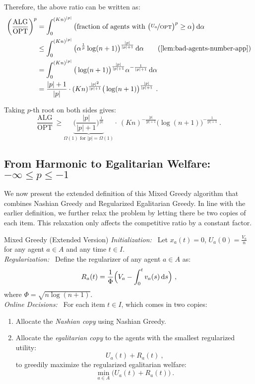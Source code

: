 \documentclass[11pt,letterpaper]{article}
\newcommand{\OPT}{\mathrm{OPT}}
\newcommand{\ALG}{\mathrm{ALG}}
\newcommand{\dif}[1]{\,\text{\rm d} #1}
\newcommand{\utility}{U}
\newcommand{\regularizer}{R}
\begin{document}
Therefore, the above ratio can be written as:
\begin{align*}
	\bigg( \frac{\ALG}{\OPT} \bigg)^p
	& = \int_0^{(Kn)^{|p|}} \big(\text{fraction of agents with $\big( \nicefrac{\utility_a}{\OPT} \big)^p \ge \alpha$}\big) \dif{\alpha} \\
	&
	\le \int_0^{(Kn)^{|p|}} \big( \alpha^{\frac{1}{p}} \log(n+1) \big)^{\frac{|p|}{|p|+1}} \dif{\alpha} 
	\tag{\Cref{lem:bad-agents-number-app}} \\
	&
	= \int_0^{(Kn)^{|p|}} \big( \log(n+1) \big)^{\frac{|p|}{|p|+1}} \alpha^{-\frac{1}{|p|+1}} \dif{\alpha} \\
	&
	= \frac{|p|+1}{|p|} \cdot (Kn)^{\frac{|p|^2}{|p|+1}} \big(\log(n+1) \big)^{\frac{|p|}{|p|+1}}
	~.
\end{align*}

Taking $p$-th root on both sides gives:
\[
\frac{\ALG}{\OPT} ~\ge \underbrace{\bigg( \frac{|p|}{|p|+1} \bigg)^{\frac{1}{|p|}}}_{\text{$\Omega(1)$ for $|p| = \Omega(1)$}} \cdot~ (Kn)^{-\frac{|p|}{|p|+1}} \big(\log(n+1) \big)^{-\frac{1}{|p|+1}}
~.
\]


\subsection[From Harmonic to Egalitarian Welfare]{From Harmonic to Egalitarian Welfare: $-\infty \le p \le -1$}
\label{sec:harmonic-to-egalitarian-app}

We now present the extended definition of this Mixed Greedy algorithm that combines Nashian Greedy and Regularized Egalitarian Greedy.
In line with the earlier definition, we further relax the problem by letting there be two copies of each item.
This relaxation only affects the competitive ratio by a constant factor.


\begin{algorithm}{Mixed Greedy (Extended Version)}
	\emph{Initialization:~}
	Let $x_a(t) = 0$, $\utility_a(0) = \frac{V_a}{n}$ for any agent $a \in A$ and any time $t \in I$.\\[2ex]
	\emph{Regularization:~}
	Define the regularizer of any agent $a \in A$ as:
	\[
	\regularizer_a(t) = \frac{1}{\Phi} 
	\Big(V_a - \int_0^t v_a(s) \dif{s} \Big)
	~,
	\]
	where $\Phi = \sqrt{n \log(n+1)}$.\\[2ex]
	\emph{Online Decisions:~}
	For each item $t \in I$, which comes in two copies:
	\begin{enumerate}
		\item Allocate the \emph{Nashian copy} using Nashian Greedy.
		\item Allocate the \emph{egalitarian copy} to the agents with the smallest regularized utility:
		\[
		\utility_a(t) + \regularizer_a(t)
		~,
		\]
		to greedily maximize the regularized egalitarian welfare:
		\[
		\min_{a \in A} \big( \utility_a(t) + \regularizer_a(t) \big)
		~.
		\]
	\end{enumerate}
\end{algorithm}
\end{document}
